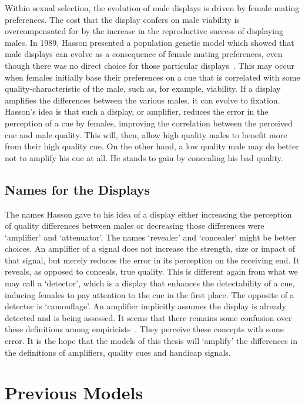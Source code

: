 \documentclass[a4paper,12pt]{article}
\numberwithin{equation}{section}
\begin{document}
Within sexual selection, the evolution of male displays is driven by female mating preferences. The cost that the display confers on male viability is overcompensated for by the increase in the reproductive success of displaying males. In 1989, Hasson presented a population genetic model which showed that male displays can evolve as a consequence of female mating preferences, even though there was no direct choice for those particular displays~\cite{Hasson1989}. This may occur when females initially base their preferences on a cue that is correlated with some quality-characteristic of the male, such as, for example, viability. If a display amplifies the differences between the various males, it can evolve to fixation. Hasson's idea is that such a display, or amplifier, reduces the error in the perception of a cue by females, improving the correlation between the perceived cue and male quality. This will, then, allow high quality males to benefit more from their high quality cue. On the other hand, a low quality male may do better not to amplify his cue at all. He stands to gain by concealing his bad quality.


\subsection{Names for the Displays}
\label{sec:Names for the Displays}

The names Hasson gave to his idea of a display either increasing the perception of quality differences between males or decreasing those differences were `amplifier' and `attenuator'. The names `revealer' and `concealer' might be better choices. An amplifier of a signal does not increase the strength, size or impact of that signal, but merely reduces the error in its perception on the receiving end. It reveals, as opposed to conceals, true quality. This is different again from what we may call a `detector', which is a display that enhances the detectability of a cue, inducing females to pay attention to the cue in the first place. The opposite of a detector is `camouflage'. An amplifier implicitly assumes the display is already detected and is being assessed. It seems that there remains some confusion over these definitions among empiricists~\cite{Gualla2008}. They perceive these concepts with some error. It is the hope that the models of this thesis will `amplify' the differences in the definitions of amplifiers, quality cues and handicap signals.

\newpage


\section{Previous Models}
\label{sec:Introduction/Previous Models}
\end{document}
